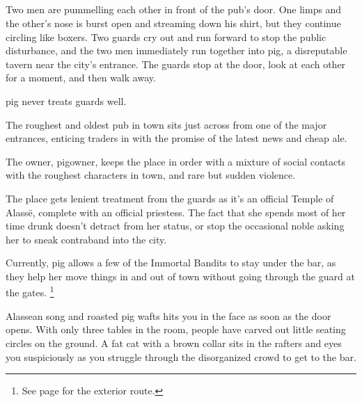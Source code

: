\subsection{}

\begin{boxtext}

  Two men are pummelling each other in front of the pub's door.
   One limps and the other's nose is burst open and streaming down his shirt, but they continue circling like boxers.
   Two guards cry out and run forward to stop the public disturbance, and the two men immediately run together into \gls{pig}, a disreputable tavern near the city's entrance.
   The guards stop at the door, look at each other for a moment, and then walk away.

\Gls{pig} never treats \glspl{guard} well.

\end{boxtext}
 
The roughest and oldest pub in \gls{town} sits just across from one of the major entrances, enticing traders in with the promise of the latest news and cheap ale.

The owner, \gls{pigowner}, keeps the place in order with a mixture of social contacts with the roughest characters in \gls{town}, and rare but sudden violence.

The place gets lenient treatment from the guards as it's an official Temple of Alass\"{e}, complete with an official priestess.
The fact that she spends most of her time drunk doesn't detract from her status, or stop the occasional noble asking her to sneak contraband into the city.

Currently, \gls{pig} allows a few of the Immortal Bandits to stay under the bar, as they help her move things in and out of town without going through the \gls{guard} at the gates.%
\footnote{See page \pageref{farmExit} for the exterior route.}



\begin{boxtext}

  Alassean song and roasted pig wafts hits you in the face as soon as the door opens.
  With only three tables in the room, people have carved out little seating circles on the ground.
  A fat cat with a brown collar sits in the rafters and eyes you suspiciously as you struggle through the disorganized crowd to get to the bar.

\end{boxtext}

